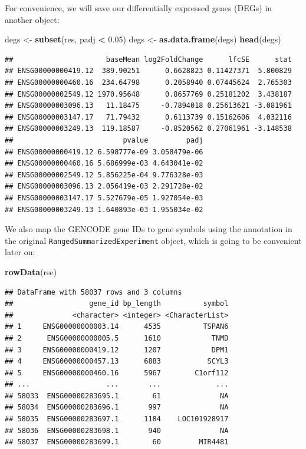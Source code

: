 \documentclass[9pt,a4paper,]{extarticle}
\newenvironment{Shaded}{\begin{snugshade}}{\end{snugshade}}
\newcommand{\KeywordTok}[1]{\textcolor[rgb]{0.13,0.29,0.53}{\textbf{#1}}}
\newcommand{\FloatTok}[1]{\textcolor[rgb]{0.00,0.00,0.81}{#1}}
\newcommand{\StringTok}[1]{\textcolor[rgb]{0.31,0.60,0.02}{#1}}
\newcommand{\OperatorTok}[1]{\textcolor[rgb]{0.81,0.36,0.00}{\textbf{#1}}}
\newcommand{\NormalTok}[1]{#1}
\begin{document}
For convenience, we will save our differentially expressed genes (DEGs) in another object:

\begin{Shaded}
\begin{Highlighting}[]
\NormalTok{degs <-}\StringTok{ }\KeywordTok{subset}\NormalTok{(res, padj }\OperatorTok{<}\StringTok{ }\FloatTok{0.05}\NormalTok{)}
\NormalTok{degs <-}\StringTok{ }\KeywordTok{as.data.frame}\NormalTok{(degs)}
\KeywordTok{head}\NormalTok{(degs)}
\end{Highlighting}
\end{Shaded}

\begin{verbatim}
##                      baseMean log2FoldChange      lfcSE      stat
## ENSG00000000419.12  389.90251      0.6628823 0.11427371  5.800829
## ENSG00000000460.16  234.64798      0.2058940 0.07445624  2.765303
## ENSG00000002549.12 1970.95648      0.8657769 0.25181202  3.438187
## ENSG00000003096.13   11.18475     -0.7894018 0.25613621 -3.081961
## ENSG00000003147.17   71.79432      0.6113739 0.15162606  4.032116
## ENSG00000003249.13  119.18587     -0.8520562 0.27061961 -3.148538
##                          pvalue         padj
## ENSG00000000419.12 6.598777e-09 3.058479e-06
## ENSG00000000460.16 5.686999e-03 4.643041e-02
## ENSG00000002549.12 5.856225e-04 9.776328e-03
## ENSG00000003096.13 2.056419e-03 2.291728e-02
## ENSG00000003147.17 5.527679e-05 1.927054e-03
## ENSG00000003249.13 1.640893e-03 1.955034e-02
\end{verbatim}

We also map the GENCODE gene IDs to gene symbols using the annotation in the original \texttt{RangedSummarizedExperiment} object, which is going to be convenient later on:

\begin{Shaded}
\begin{Highlighting}[]
\KeywordTok{rowData}\NormalTok{(rse)}
\end{Highlighting}
\end{Shaded}

\begin{verbatim}
## DataFrame with 58037 rows and 3 columns
##                  gene_id bp_length          symbol
##              <character> <integer> <CharacterList>
## 1     ENSG00000000003.14      4535          TSPAN6
## 2      ENSG00000000005.5      1610            TNMD
## 3     ENSG00000000419.12      1207            DPM1
## 4     ENSG00000000457.13      6883           SCYL3
## 5     ENSG00000000460.16      5967        C1orf112
## ...                  ...       ...             ...
## 58033  ENSG00000283695.1        61              NA
## 58034  ENSG00000283696.1       997              NA
## 58035  ENSG00000283697.1      1184    LOC101928917
## 58036  ENSG00000283698.1       940              NA
## 58037  ENSG00000283699.1        60         MIR4481
\end{verbatim}
\end{document}
